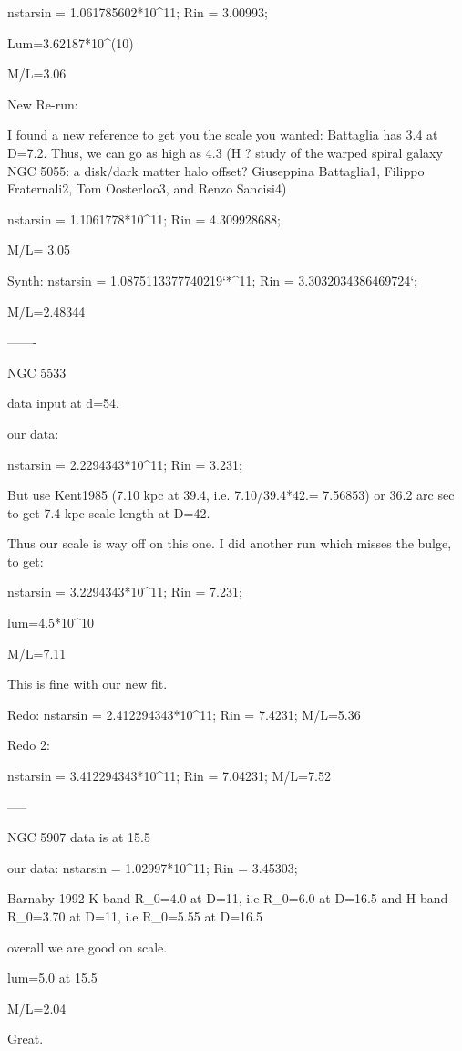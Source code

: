 nstarsin = 1.061785602*10^11;
Rin = 3.00993;

Lum=3.62187*10^(10)

M/L=3.06


New Re-run:

I found a new reference to get you the scale you wanted:  Battaglia has 3.4 at D=7.2.  Thus, we can go as high as 4.3 (H ? study of the warped spiral galaxy NGC 5055: a disk/dark matter halo offset?
Giuseppina Battaglia1, Filippo Fraternali2, Tom Oosterloo3, and Renzo Sancisi4)

nstarsin = 1.1061778*10^11;
Rin = 4.309928688;

M/L= 3.05

Synth:
nstarsin = 1.0875113377740219`*^11;
Rin = 3.3032034386469724`;

M/L=2.48344



-------

NGC 5533

data input at d=54.

our data:

nstarsin = 2.2294343*10^11;
Rin = 3.231;

But use Kent1985  (7.10 kpc at 39.4, i.e. 7.10/39.4*42.= 7.56853) or
 36.2 arc sec to get 7.4 kpc scale length at D=42. 
 
 Thus our scale is way off on this one.  I did another run which misses the bulge, to get:
 

nstarsin = 3.2294343*10^11;
Rin = 7.231;

lum=4.5*10^10

M/L=7.11

This is fine with our new fit.

Redo:
nstarsin = 2.412294343*10^11;
Rin = 7.4231;
M/L=5.36

Redo 2:

nstarsin = 3.412294343*10^11;
Rin = 7.04231;
M/L=7.52

-----

NGC 5907
data is at 15.5

our data:
nstarsin = 1.02997*10^11;
Rin = 3.45303;

Barnaby 1992 K band R_0=4.0 at D=11, i.e R_0=6.0 at D=16.5 
and H band R_0=3.70 at D=11, i.e R_0=5.55 at D=16.5

overall we are good on scale.

lum=5.0 at 15.5

M/L=2.04

Great.



